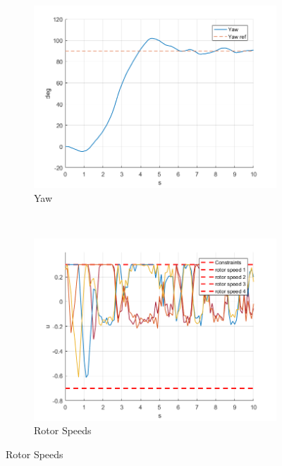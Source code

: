 \documentclass[11pt]{article}
\begin{document}
\begin{enumerate}
\begin{figure}[ht]
\begin{subfigure}[c]{0.3\linewidth}
            \includegraphics[width=\linewidth]{Plots_14_SlewRateConstraints/02}
            \caption{Yaw}
        \end{subfigure}
        ~
        \begin{subfigure}[c]{0.3\linewidth}
            \centering
            \includegraphics[width=\linewidth]{Plots_14_SlewRateConstraints/03}
            \caption{Rotor Speeds}
        \end{subfigure}


\end{figure}
\end{enumerate}
\end{document}

